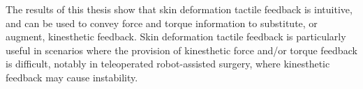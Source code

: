 \documentclass[12pt,twoside]{report}
\begin{document}
The results of this thesis show that skin deformation tactile feedback is intuitive, and can be used to convey force and torque information to substitute, or augment, kinesthetic feedback. Skin deformation tactile feedback is particularly useful in scenarios where the provision of kinesthetic force and/or torque feedback is difficult, notably in teleoperated robot-assisted surgery, where kinesthetic feedback may cause instability. 




\tableofcontents

\listoftables

\listoffigures

 
\pagestyle{headings}


\renewcommand{\thepage}{\arabic{page}}%






\end{document}
